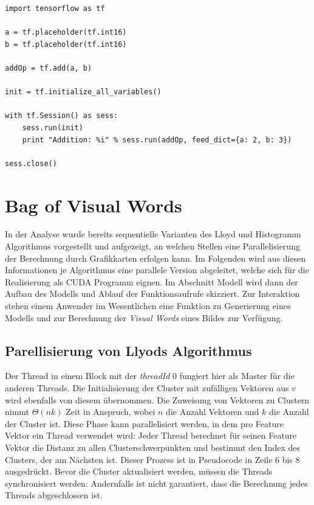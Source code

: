 \lstset{language=Python}
\begin{lstlisting}
import tensorflow as tf

a = tf.placeholder(tf.int16)
b = tf.placeholder(tf.int16)

addOp = tf.add(a, b)

init = tf.initialize_all_variables()

with tf.Session() as sess:
    sess.run(init)
    print "Addition: %i" % sess.run(addOp, feed_dict={a: 2, b: 3})

sess.close()
\end{lstlisting}

\section{Bag of Visual Words}

In der Analyse wurde bereits sequentielle Varianten des Lloyd und Histogramm Algorithmus vorgestellt und aufgezeigt, an welchen Stellen eine Parallelisierung der Berechnung durch Grafikkarten erfolgen kann. Im Folgenden wird aus diesen Informationen je Algorithmus eine parallele Version abgeleitet, welche sich für die Realisierung als CUDA Programm eignen.
Im Abschnitt Modell wird dann der Aufbau des Modells und Ablauf der Funktionsaufrufe skizziert. Zur Interaktion stehen einem Anwender im Wesentlichen eine Funktion zu Generierung eines Modells und zur Berechnung der \textit{Visual Words} eines Bildes zur Verfügung.

\subsection{Parellisierung von Llyods Algorithmus}

Der Thread in einem Block mit der \textit{threadId} 0 fungiert hier als Master für die anderen Threads. Die Initialisierung der Cluster mit zufälligen Vektoren aus $v$ wird ebenfalls von diesem übernommen. Die Zuweisung von Vektoren zu Clustern nimmt $\Theta(nk)$ Zeit in Anspruch, wobei $n$ die Anzahl Vektoren und $k$ die Anzahl der Cluster ist. Diese Phase kann parallelisiert werden, in dem pro Feature Vektor ein Thread verwendet wird: Jeder Thread berechnet für seinen Feature Vektor die Distanz zu allen Clusterschwerpunkten und bestimmt den Index des Clusters, der am Nächsten ist. Dieser Prozess ist in Pseudocode in Zeile 6 bis 8 ausgedrückt. Bevor die Cluster aktualisiert werden, müssen die Threads synchronisiert werden: Andernfalls ist nicht garantiert, dass die Berechnung jedes Threads abgeschlossen ist.

